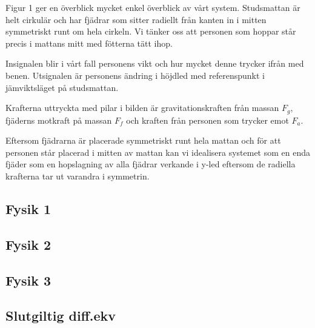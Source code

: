 \documentclass[10pt,a4paper]{article}
\begin{document}
Figur 1 ger en överblick mycket enkel överblick av vårt system. Studsmattan är helt cirkulär och har fjädrar som sitter radiellt från kanten in i mitten symmetriskt runt om hela cirkeln. Vi tänker oss att personen som hoppar står precis i mattans mitt med fötterna tätt ihop.

Insignalen blir i vårt fall personens vikt och hur mycket denne trycker ifrån med benen. Utsignalen är personens ändring i höjdled med referenspunkt i jämviktsläget på studsmattan.

Krafterna uttryckta med pilar i bilden är gravitationskraften från massan $F_g$, fjäderns motkraft på massan $F_f$ och kraften från personen som trycker emot $F_a$.

Eftersom fjädrarna är placerade symmetriskt runt hela mattan och för att personen står placerad i mitten av mattan kan vi idealisera systemet som en enda fjäder som en hopslagning av alla fjädrar verkande i y-led eftersom de radiella krafterna tar ut varandra i symmetrin.

\subsection{Fysik 1}

\subsection{Fysik 2}

\subsection{Fysik 3}

\subsection{Slutgiltig diff.ekv}
\end{document}
